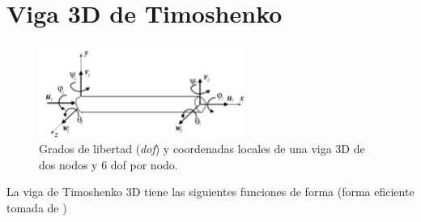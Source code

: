 \documentclass[11pt, a4paper,titlepage]{article}
\begin{document}
\section{Viga 3D de Timoshenko}
\begin{figure}[htb!]
	\centering
	\includegraphics[width=0.6\textwidth]{fig/3dbeam.PNG}
	\caption{Grados de libertad (\textit{dof}) y coordenadas locales de una viga 3D de dos nodos y 6 dof por nodo.}
\end{figure}
La viga de Timoshenko 3D tiene las siguientes funciones de forma (forma eficiente tomada de \cite{luo2008efficient})
\end{document}
